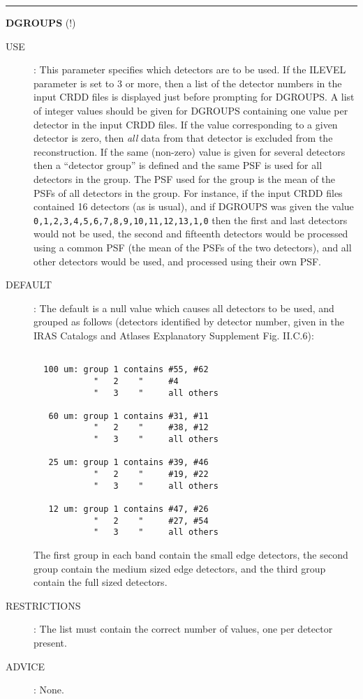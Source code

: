 \rule{\textwidth}{0.3mm}
{\Large {\bf DGROUPS} (!)}
\begin{description}
\item [USE]:
This parameter specifies which detectors are to be used. If the ILEVEL
parameter is set to 3 or more, then a list of the detector numbers
in the input CRDD files is displayed just before prompting for DGROUPS. A list
of integer values should be given for DGROUPS containing one value per detector
in the input CRDD files. If the value corresponding to a given detector is zero,
then {\em all} data from that detector is excluded from the reconstruction. If
the same (non-zero) value is given for several detectors then a ``detector
group'' is defined and the same PSF is used for all detectors in the group.
The PSF used for the group is the mean of the PSFs of all detectors in the
group. For instance, if the input CRDD files contained 16 detectors (as is
usual), and if DGROUPS was given the value
{\tt 0,1,2,3,4,5,6,7,8,9,10,11,12,13,1,0} then the first and last detectors
would not be used, the second and fifteenth detectors would be processed using
a common PSF (the mean of the PSFs of the two detectors), and all other
detectors would be used, and processed using their own PSF.
\item [DEFAULT]:
The default is a null value which causes all detectors to be used, and grouped
as follows (detectors identified by detector number, given in the IRAS
Catalogs and Atlases Explanatory Supplement Fig. II.C.6):
\begin{verbatim}

  100 um: group 1 contains #55, #62
            "   2    "     #4
            "   3    "     all others

   60 um: group 1 contains #31, #11
            "   2    "     #38, #12
            "   3    "     all others

   25 um: group 1 contains #39, #46
            "   2    "     #19, #22
            "   3    "     all others

   12 um: group 1 contains #47, #26
            "   2    "     #27, #54
            "   3    "     all others

\end{verbatim}
The first group in each band contain the small edge detectors, the second group
contain the medium sized edge detectors, and the third group contain the
full sized detectors.
\item [RESTRICTIONS]:
The list must contain the correct number of values, one per detector present.
\item [ADVICE]:
None.
\end {description}

